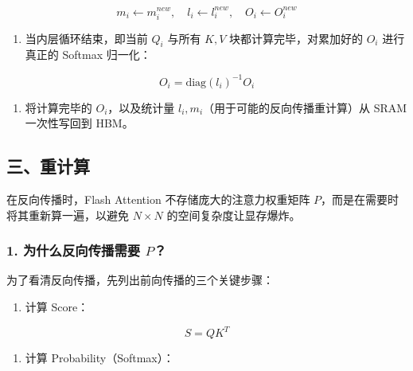 \[
m_i \leftarrow m_i^{new},\quad l_i \leftarrow l_i^{new},\quad O_i \leftarrow O_i^{new}
\]

\begin{enumerate}
\def\labelenumi{\arabic{enumi}.}
\setcounter{enumi}{3}
\tightlist
\item
{}
  当内层循环结束，即当前 \(Q_i\) 与所有 \(K,V\) 块都计算完毕，对累加好的 \(O_i\) 进行真正的 Softmax 归一化：
\end{enumerate}

\[
O_i = \mathrm{diag}(l_i)^{-1}O_i
\]

\begin{enumerate}
\def\labelenumi{\arabic{enumi}.}
\setcounter{enumi}{4}
\tightlist
\item
  将计算完毕的 \(O_i\)，以及统计量 \(l_i,m_i\)（用于可能的反向传播重计算）从 SRAM 一次性写回到 HBM。
\end{enumerate}

\hypertarget{ux4e09ux91cdux8ba1ux7b97}{%
\subsection{三、重计算}\label{ux4e09ux91cdux8ba1ux7b97}}

在反向传播时，Flash Attention 不存储庞大的注意力权重矩阵 \(P\)，而是在需要时将其重新算一遍，以避免 \(N \times N\) 的空间复杂度让显存爆炸。

\hypertarget{ux4e3aux4ec0ux4e48ux53cdux5411ux4f20ux64adux9700ux8981-p}{%
\subsubsection{\texorpdfstring{1. 为什么反向传播需要 \(P\)？}{1. 为什么反向传播需要 P？}}\label{ux4e3aux4ec0ux4e48ux53cdux5411ux4f20ux64adux9700ux8981-p}}

为了看清反向传播，先列出前向传播的三个关键步骤：

\begin{enumerate}
\def\labelenumi{\arabic{enumi}.}
\tightlist
\item
{}
  计算 Score：
\end{enumerate}

\[
S = QK^T
\]

\begin{enumerate}
\def\labelenumi{\arabic{enumi}.}
\setcounter{enumi}{1}
\tightlist
\item
{}
  计算 Probability（Softmax）：
\end{enumerate}

